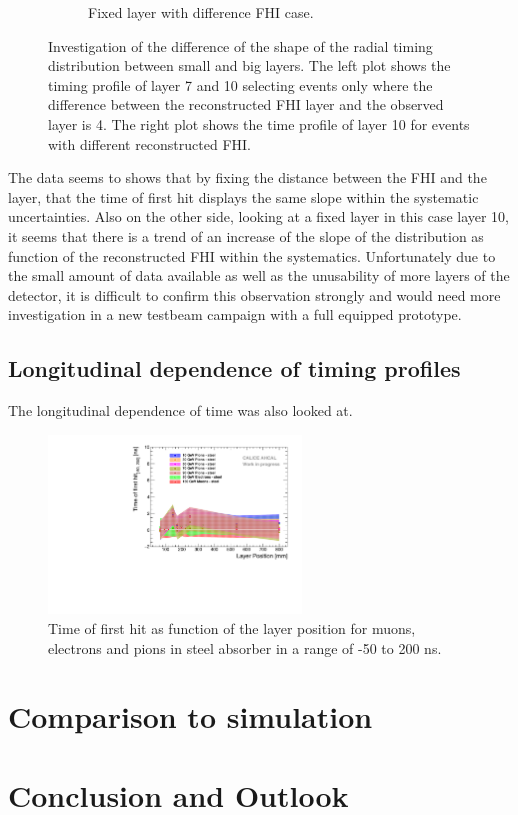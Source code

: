 \begin{figure}[htbp!]
\begin{subfigure}[t]{0.45\textwidth}
		\caption{Fixed layer with difference FHI case.}\label{fig:Radius_FHI_Fixed}
	\end{subfigure}
	\caption{Investigation of the difference of the shape of the radial timing distribution between small and big layers. The left plot shows the timing profile of layer 7 and 10 selecting events only where the difference between the reconstructed FHI layer and the observed layer is 4. The right plot shows the time profile of layer 10 for events with different reconstructed FHI.}
	\label{fig:Radius_FHI}
\end{figure}

The data seems to shows that by fixing the distance between the FHI and the layer, that the time of first hit displays the same slope within the systematic uncertainties. Also on the other side, looking at a fixed layer in this case layer 10, it seems that there is a trend of an increase of the slope of the distribution as function of the reconstructed FHI within the systematics. Unfortunately due to the small amount of data available as well as the unusability of more layers of the detector, it is difficult to confirm this observation strongly and would need more investigation in a new testbeam campaign with a full equipped prototype.

\subsection{Longitudinal dependence of timing profiles}

The longitudinal dependence of time was also looked at.

\begin{figure}[htbp!]
	\centering
	\includegraphics[width=0.6\textwidth]{chap5/fig_AHCAL_timing/Pions/Timing_Depth_Comparison_ShortAsymRange.pdf}
	\caption{Time of first hit as function of the layer position for muons, electrons and pions in steel absorber in a range of -50 to 200 ns.}
	\label{fig:Depth_Comparison}
\end{figure}

\section{Comparison to simulation}



\section{Conclusion and Outlook}
